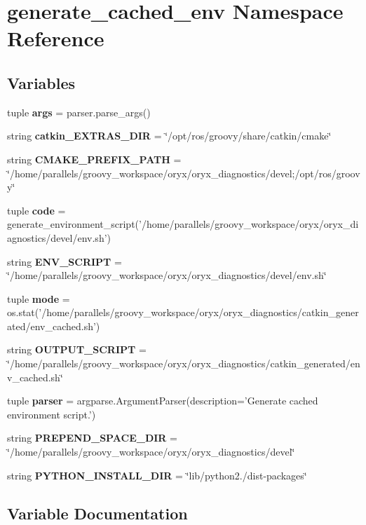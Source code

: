 \section{generate\-\_\-cached\-\_\-env \-Namespace \-Reference}
\label{namespacegenerate__cached__env}
\subsection*{\-Variables}
\begin{DoxyCompactItemize}
\item 
tuple {\bf args} = parser.\-parse\-\_\-args()
\item 
string {\bf catkin\-\_\-\-E\-X\-T\-R\-A\-S\-\_\-\-D\-I\-R} = \char`\"{}/opt/ros/groovy/share/catkin/cmake\char`\"{}
\item 
string {\bf \-C\-M\-A\-K\-E\-\_\-\-P\-R\-E\-F\-I\-X\-\_\-\-P\-A\-T\-H} = \char`\"{}/home/parallels/groovy\-\_\-workspace/oryx/oryx\-\_\-diagnostics/devel;/opt/ros/groovy\char`\"{}
\item 
tuple {\bf code} = generate\-\_\-environment\-\_\-script('/home/parallels/groovy\-\_\-workspace/oryx/oryx\-\_\-diagnostics/devel/env.\-sh')
\item 
string {\bf \-E\-N\-V\-\_\-\-S\-C\-R\-I\-P\-T} = \char`\"{}/home/parallels/groovy\-\_\-workspace/oryx/oryx\-\_\-diagnostics/devel/env.\-sh\char`\"{}
\item 
tuple {\bf mode} = os.\-stat('/home/parallels/groovy\-\_\-workspace/oryx/oryx\-\_\-diagnostics/catkin\-\_\-generated/env\-\_\-cached.\-sh')
\item 
string {\bf \-O\-U\-T\-P\-U\-T\-\_\-\-S\-C\-R\-I\-P\-T} = \char`\"{}/home/parallels/groovy\-\_\-workspace/oryx/oryx\-\_\-diagnostics/catkin\-\_\-generated/env\-\_\-cached.\-sh\char`\"{}
\item 
tuple {\bf parser} = argparse.\-Argument\-Parser(description='\-Generate cached environment script.')
\item 
string {\bf \-P\-R\-E\-P\-E\-N\-D\-\_\-\-S\-P\-A\-C\-E\-\_\-\-D\-I\-R} = \char`\"{}/home/parallels/groovy\-\_\-workspace/oryx/oryx\-\_\-diagnostics/devel\char`\"{}
\item 
string {\bf \-P\-Y\-T\-H\-O\-N\-\_\-\-I\-N\-S\-T\-A\-L\-L\-\_\-\-D\-I\-R} = \char`\"{}lib/python2./dist-\/packages\char`\"{}
\end{DoxyCompactItemize}


\subsection{\-Variable \-Documentation}
